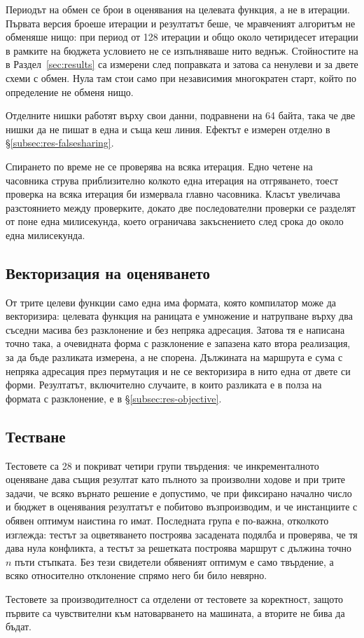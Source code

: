 Периодът на обмен се брои в оценявания на целевата функция, а не в итерации. Първата
версия броеше итерации и резултатът беше, че мравченият алгоритъм не обменяше нищо:
при период от 128 итерации и общо около четиридесет итерации в рамките на бюджета
условието не се изпълняваше нито веднъж. Стойностите на  в
Раздел~\ref{sec:results} са измерени след поправката и затова са ненулеви и за двете
схеми с обмен. Нула там стои само при независимия многократен старт, който по
определение не обменя нищо.

Отделните нишки работят върху свои данни, подравнени на 64 байта, така че две нишки да
не пишат в една и съща кеш линия. Ефектът е измерен отделно в
§\ref{subsec:res-falsesharing}.

Спирането по време не се проверява на всяка итерация. Едно четене на часовника струва
приблизително колкото една итерация на отгряването, тоест проверка на всяка итерация
би измервала главно часовника. Класът  увеличава разстоянието между
проверките, докато две последователни проверки се разделят от поне една милисекунда,
което ограничава закъснението след срока до около една милисекунда.

\subsection{Векторизация на оценяването}
\label{subsec:impl-simd}

От трите целеви функции само една има формата, която компилатор може да векторизира:
целевата функция на раницата е умножение и натрупване върху два съседни масива без
разклонение и без непряка адресация. Затова тя е написана точно така, а очевидната
форма с разклонение е запазена като втора реализация, за да бъде разликата измерена, а
не спорена. Дължината на маршрута е сума с непряка адресация през пермутация и не се
векторизира в нито една от двете си форми. Резултатът, включително случаите, в които
разликата е в полза на формата с разклонение, е в §\ref{subsec:res-objective}.

\subsection{Тестване}
\label{subsec:impl-tests}

Тестовете са 28 и покриват четири групи твърдения: че инкременталното оценяване дава
същия резултат като пълното за произволни ходове и при трите задачи, че всяко върнато
решение е допустимо, че при фиксирано начално число и бюджет в оценявания резултатът е
побитово възпроизводим, и че инстанциите с обявен оптимум наистина го имат. Последната
група е по-важна, отколкото изглежда: тестът за оцветяването построява засадената
подялба и проверява, че тя дава нула конфликта, а тестът за решетката построява
маршрут с дължина точно $n$ пъти стъпката. Без тези свидетели обявеният оптимум е само
твърдение, а всяко относително отклонение спрямо него би било невярно.

Тестовете за производителност са отделени от тестовете за коректност, защото първите
са чувствителни към натоварването на машината, а вторите не бива да бъдат.
